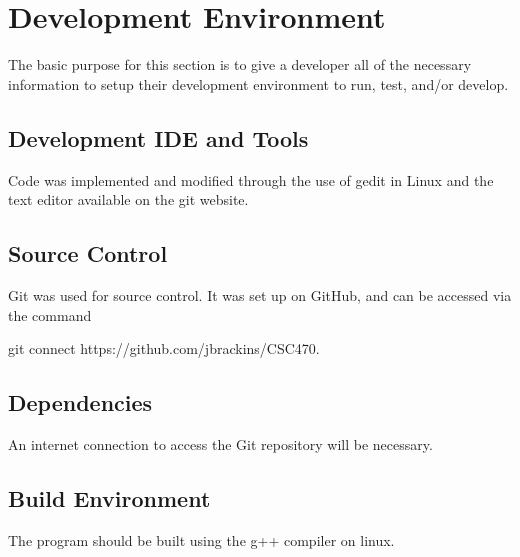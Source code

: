 \chapter{Development Environment}
The basic purpose for this section is to give a developer all of the necessary 
information to setup their development environment to run, test, and/or develop. 


\section{Development IDE and Tools}
Code was implemented and modified through the use of gedit in Linux and the text editor available on the git website.

\section{Source  Control}
Git was used for source control. It was set up on GitHub, and can be accessed via the command
	
	git connect https://github.com/jbrackins/CSC470.

\section{Dependencies}
An internet connection to access the Git repository will be necessary.

\section{Build  Environment}
The program should be built using the g++ compiler on linux.


